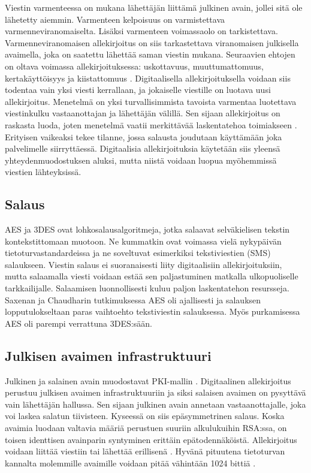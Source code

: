\documentclass[finnish]{tktltiki2}
\theoremstyle{definition}
\theoremstyle{remark}
\begin{document}
Viestin varmenteessa on mukana lähettäjän liittämä julkinen avain, jollei sitä ole lähetetty aiemmin. Varmenteen kelpoisuus on varmistettava varmenneviranomaiselta. Lisäksi varmenteen voimassaolo on tarkistettava. Varmenneviranomaisen allekirjoitus on siis tarkastettava viranomaisen julkisella avaimella, joka on saatettu lähettää saman viestin mukana. Seuraavien ehtojen on oltava voimassa allekirjoituksessa: uskottavuus, muuttumattomuus, kertakäyttöisyys ja kiistattomuus \cite{e-c}. Digitaalisella allekirjoituksella voidaan siis todentaa vain yksi viesti kerrallaan, ja jokaiselle viestille on luotava uusi allekirjoitus. Menetelmä on yksi turvallisimmista tavoista varmentaa luotettava viestinkulku vastaanottajan ja lähettäjän välillä. Sen sijaan allekirjoitus on raskasta luoda, joten menetelmä vaatii merkittävää laskentatehoa toimiakseen \cite{proxy}. Erityisen vaikeaksi tekee tilanne, jossa salausta joudutaan käyttämään joka palvelimelle siirryttäessä. Digitaalisia allekirjoituksia käytetään siis yleensä yhteydenmuodostuksen aluksi, mutta niistä voidaan luopua myöhemmissä viestien lähteyksissä.

\subsection{Salaus} 

AES ja 3DES ovat lohkosalausalgoritmeja, jotka salaavat selväkielisen tekstin 
kontekstittomaan muotoon.  Ne kummatkin ovat voimassa vielä nykypäivän tietoturvastandardeissa ja ne soveltuvat esimerkiksi tekstiviestien (SMS) salaukseen. Viestin salaus ei suoranaisesti liity digitaalisiin allekirjoituksiin, mutta salaamalla viesti voidaan estää sen paljastuminen matkalla ulkopuoliselle tarkkailijalle. Salaamisen luonnollisesti kuluu paljon laskentatehon resursseja. Saxenan ja Chaudharin tutkimuksessa AES oli ajallisesti ja salauksen lopputulokseltaan paras vaihtoehto tekstiviestin salauksessa. Myös purkamisessa AES oli parempi verrattuna 3DES:sään. \cite{gsm}


\subsection{Julkisen avaimen infrastruktuuri}

Julkinen ja salainen avain muodostavat PKI-mallin \cite{ECC}. Digitaalinen allekirjoitus perustuu julkisen avaimen infrastruktuuriin ja siksi salaisen avaimen on pysyttävä vain lähettäjän hallussa. Sen sijaan julkinen avain annetaan vastaanottajalle, joka voi laskea salatun tiivisteen. Kyseessä on siis epäsymmetrinen salaus. Koska avaimia luodaan valtavia määriä perustuen suuriin alkulukuihin RSA:ssa, on toisen identtisen avainparin syntyminen erittäin epätodennäköistä. Allekirjoitus voidaan liittää viestiin tai lähettää erillisenä \cite{moen}. Hyvänä pituutena tietoturvan kannalta molemmille avaimille voidaan pitää vähintään 1024 bittiä \cite{ECC}. 
\end{document}
